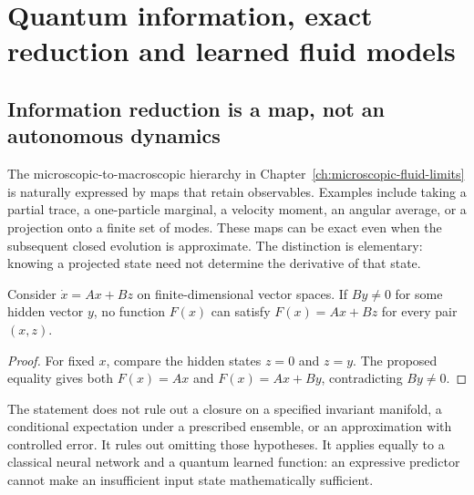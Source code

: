 \chapter{Quantum information, exact reduction and learned fluid models}
\label{ch:quantum-fluid}

\section{Information reduction is a map, not an autonomous dynamics}

The microscopic-to-macroscopic hierarchy in Chapter~\ref{ch:microscopic-fluid-limits} is naturally expressed by maps that retain observables. Examples include taking a partial trace, a one-particle marginal, a velocity moment, an angular average, or a projection onto a finite set of modes. These maps can be exact even when the subsequent closed evolution is approximate. The distinction is elementary: knowing a projected state need not determine the derivative of that state.

\begin{proposition}
\label{prop:fluid-closure-obstruction}
Consider $\dot x=Ax+Bz$ on finite-dimensional vector spaces. If $By\ne0$ for some hidden vector $y$, no function $F(x)$ can satisfy $F(x)=Ax+Bz$ for every pair $(x,z)$.
\end{proposition}
\begin{proof}
For fixed $x$, compare the hidden states $z=0$ and $z=y$. The proposed equality gives both $F(x)=Ax$ and $F(x)=Ax+By$, contradicting $By\ne0$.
\end{proof}

The statement does not rule out a closure on a specified invariant manifold, a conditional expectation under a prescribed ensemble, or an approximation with controlled error. It rules out omitting those hypotheses. It applies equally to a classical neural network and a quantum learned function: an expressive predictor cannot make an insufficient input state mathematically sufficient.

